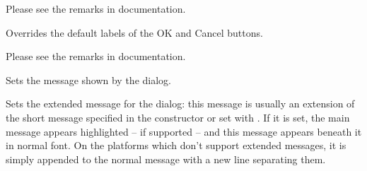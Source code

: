 Please see the remarks in 
 documentation.


\label{wxmessagedialogsetokcancellabels}


Overrides the default labels of the OK and Cancel buttons.

Please see the remarks in 
 documentation.


\label{wxmessagedialogsetmessage}


Sets the message shown by the dialog.


\label{wxmessagedialogsetextendedmessage}


Sets the extended message for the dialog: this message is usually an extension
of the short message specified in the constructor or set with 
. If it is set, the main message
appears highlighted -- if supported -- and this message appears beneath it in
normal font. On the platforms which don't support extended messages, it is
simply appended to the normal message with a new line separating them.

